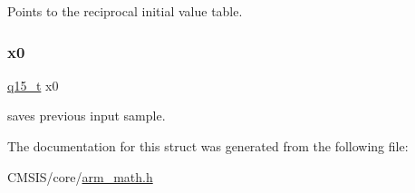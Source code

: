 Points to the reciprocal initial value table. \mbox{\label{structarm__lms__norm__instance__q15_a3c975fed200b19723a2ed11efccca6cd}} 
\subsubsection{\texorpdfstring{x0}{x0}}
{\footnotesize\ttfamily \mbox{\hyperlink{arm__math_8h_ab5a8fb21a5b3b983d5f54f31614052ea}{q15\+\_\+t}} x0}

saves previous input sample. 

The documentation for this struct was generated from the following file\+:\begin{DoxyCompactItemize}
\item 
C\+M\+S\+I\+S/core/\mbox{\hyperlink{arm__math_8h}{arm\+\_\+math.\+h}}\end{DoxyCompactItemize}
